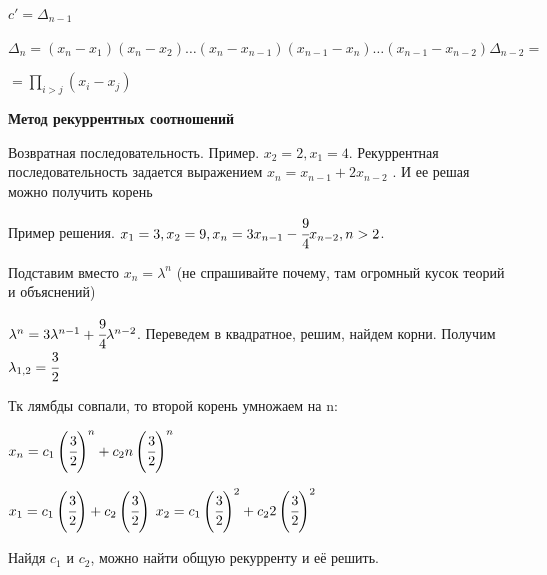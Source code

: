 \documentclass[twoside]{book}
\begin{document}
\(c' = \Delta_{n - 1}\)

\(\Delta_n = (x_n - x_1)(x_n - x_2)\ldots(x_n - x_{n - 1})(x_{n - 1} - x_n)\ldots(x_{n - 1} - x_{n - 2}) \Delta_{n - 2} =\)

\(= \prod\limits_{i > j}(x_i - x_j)\)

\textbf{Метод рекуррентных соотношений}

Возвратная последовательность. Пример.  \(x_2 = 2, x_1 = 4\). Рекуррентная последовательность задается выражением \(x_n = x_{n - 1} + 2 x_{n - 2}\) . И ее решая можно получить  корень

Пример решения. \(x_1 = 3, x_2 = 9, x_n = 3 x_{n-1} - \cfrac{9}{4} x_{n-2}, n >2\).

Подставим вместо \(x_n = \lambda^n \) (не спрашивайте почему, там огромный кусок теорий и объяснений)

\( \lambda^n  = 3\lambda^{n-1} +  \cfrac{9}{4}\lambda^{n-2}\). Переведем в квадратное, решим, найдем корни. Получим \(\lambda_{1,2} = \cfrac{3}{2}\)

Тк лямбды совпали, то второй корень умножаем на n:

\(x_n  = c_1 \left(\cfrac{3}{2}\right)^n  + c_2 n \left(\cfrac{3}{2}\right)^n \)

\(x_1 = c_1 \left(\cfrac{3}{2}\right) + c_2 \left(\cfrac{3}{2}\right)\)
\(x_2 = c_1 \left(\cfrac{3}{2}\right)^2 + c_2 2 \left(\cfrac{3}{2}\right)^2\)

Найдя \(c_1\) и \(c_2\), можно найти общую рекурренту и её решить.
\end{document}
